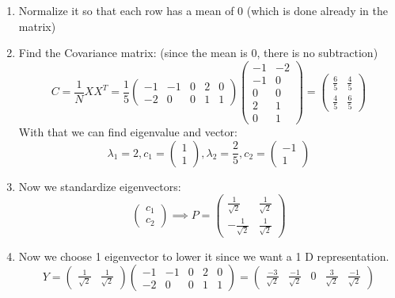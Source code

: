 \documentclass[letterpaper,12pt]{article}
\begin{document}
    \begin{enumerate}
        \item Normalize it so that each row has a mean of 0 (which is done already in the matrix)
        \item Find the Covariance matrix: (since the mean is 0, there is no subtraction)\[C = \frac{1}{N}XX^T=\frac{1}{5}\begin{pmatrix}
            -1 & -1 & 0 & 2 & 0\\
        -2 & 0 & 0 & 1 & 1
        \end{pmatrix}\begin{pmatrix}
            -1 & -2\\
            -1 & 0\\
            0 & 0\\
            2 & 1\\
            0 & 1
        \end{pmatrix} = \begin{pmatrix}
            \frac{6}{5} & \frac{4}{5}\\
            \frac{4}{5} & \frac{6}{5}
        \end{pmatrix}\]
        With that we can find eigenvalue and vector: \[\lambda_1 = 2, c_1=\begin{pmatrix}
            1\\1
        \end{pmatrix}, \lambda_2 = \frac{2}{5}, c_2=\begin{pmatrix}
            -1\\1
        \end{pmatrix}\]
        \item Now we standardize eigenvectors:\[\begin{pmatrix}
            c_1\\c_2
        \end{pmatrix}\implies P = \begin{pmatrix}
            \frac{1}{\sqrt{2}} & \frac{1}{\sqrt{2}}\\
            -\frac{1}{\sqrt{2}} & \frac{1}{\sqrt{2}}
        \end{pmatrix}\]

        \item Now we choose 1 eigenvector to lower it since we want a 1 D representation.
        \[Y = \begin{pmatrix}
            \frac{1}{\sqrt{2}} & \frac{1}{\sqrt{2}}
        \end{pmatrix} \begin{pmatrix}
            -1 & -1 & 0 & 2 & 0\\
        -2 & 0 & 0 & 1 & 1
        \end{pmatrix} = \begin{pmatrix}
            \frac{-3}{\sqrt{2}} & \frac{-1}{\sqrt{2}} & 0 & \frac{3}{\sqrt{2}} & \frac{-1}{\sqrt{2}}
        \end{pmatrix} \]
    \end{enumerate}
\end{document}
